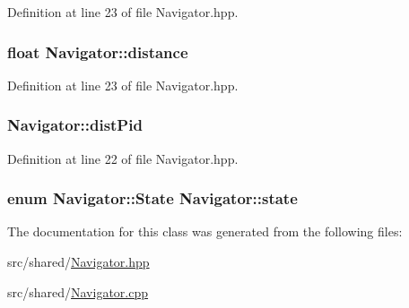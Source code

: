 Definition at line 23 of file Navigator.\-hpp.

\hypertarget{classNavigator_accc10be1bc4dfe67ce799e69869f0caa}{
\subsubsection[{distance}]{\setlength{\rightskip}{0pt plus 5cm}float Navigator\-::distance\hspace{0.3cm}{\ttfamily [private]}}}\label{classNavigator_accc10be1bc4dfe67ce799e69869f0caa}


Definition at line 23 of file Navigator.\-hpp.

\hypertarget{classNavigator_ab6f4e8b5937d700d4514c438cb7b3927}{
\subsubsection[{dist\-Pid}]{ Navigator\-::dist\-Pid\hspace{0.3cm}{\ttfamily [private]}}}\label{classNavigator_ab6f4e8b5937d700d4514c438cb7b3927}


Definition at line 22 of file Navigator.\-hpp.

\hypertarget{classNavigator_a15263fe64d0ea29a1bbfe9e5ef849c4c}{
\subsubsection[{state}]{\setlength{\rightskip}{0pt plus 5cm}enum {\bf Navigator\-::\-State}  Navigator\-::state\hspace{0.3cm}{\ttfamily [private]}}}\label{classNavigator_a15263fe64d0ea29a1bbfe9e5ef849c4c}


The documentation for this class was generated from the following files\-:\begin{DoxyCompactItemize}
\item 
src/shared/\hyperlink{Navigator_8hpp}{Navigator.\-hpp}\item 
src/shared/\hyperlink{Navigator_8cpp}{Navigator.\-cpp}\end{DoxyCompactItemize}
